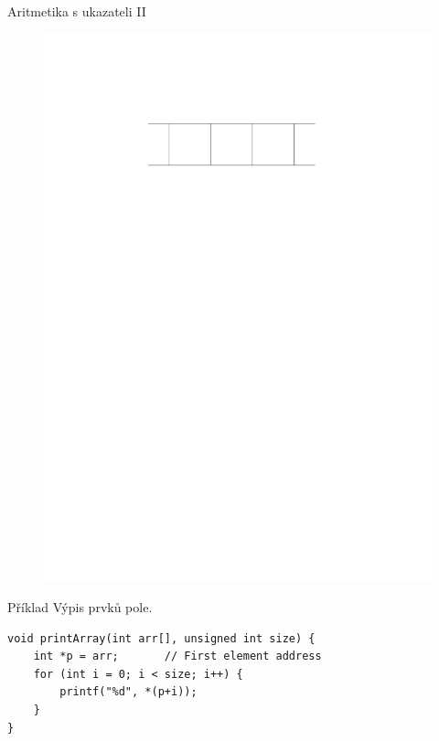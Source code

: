 \documentclass[14pt,aspectratio=169]{beamer}
\begin{document}
    \begin{frame}{Aritmetika s ukazateli II}
        \begin{figure}
            \centering
            \includegraphics{images/pointer_arith.pdf}
        \end{figure}
    \end{frame}

    \begin{frame}[fragile]{Příklad}
        Výpis prvků pole.
        \begin{lstlisting}
void printArray(int arr[], unsigned int size) {
    int *p = arr;       // First element address
    for (int i = 0; i < size; i++) {
        printf("%d", *(p+i));
    }
}
        \end{lstlisting}
    \end{frame}
\end{document}
